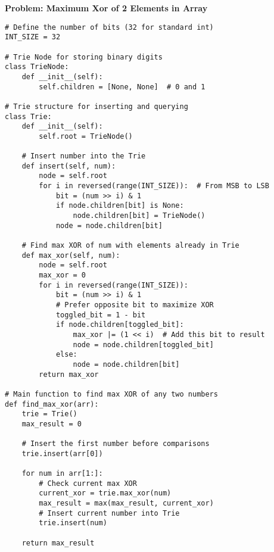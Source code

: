 \noindent\textbf{Problem: Maximum Xor of 2 Elements in Array}
\begin{verbatim}
# Define the number of bits (32 for standard int)
INT_SIZE = 32

# Trie Node for storing binary digits
class TrieNode:
    def __init__(self):
        self.children = [None, None]  # 0 and 1

# Trie structure for inserting and querying
class Trie:
    def __init__(self):
        self.root = TrieNode()

    # Insert number into the Trie
    def insert(self, num):
        node = self.root
        for i in reversed(range(INT_SIZE)):  # From MSB to LSB
            bit = (num >> i) & 1
            if node.children[bit] is None:
                node.children[bit] = TrieNode()
            node = node.children[bit]

    # Find max XOR of num with elements already in Trie
    def max_xor(self, num):
        node = self.root
        max_xor = 0
        for i in reversed(range(INT_SIZE)):
            bit = (num >> i) & 1
            # Prefer opposite bit to maximize XOR
            toggled_bit = 1 - bit
            if node.children[toggled_bit]:
                max_xor |= (1 << i)  # Add this bit to result
                node = node.children[toggled_bit]
            else:
                node = node.children[bit]
        return max_xor

# Main function to find max XOR of any two numbers
def find_max_xor(arr):
    trie = Trie()
    max_result = 0

    # Insert the first number before comparisons
    trie.insert(arr[0])

    for num in arr[1:]:
        # Check current max XOR
        current_xor = trie.max_xor(num)
        max_result = max(max_result, current_xor)
        # Insert current number into Trie
        trie.insert(num)

    return max_result
\end{verbatim}

